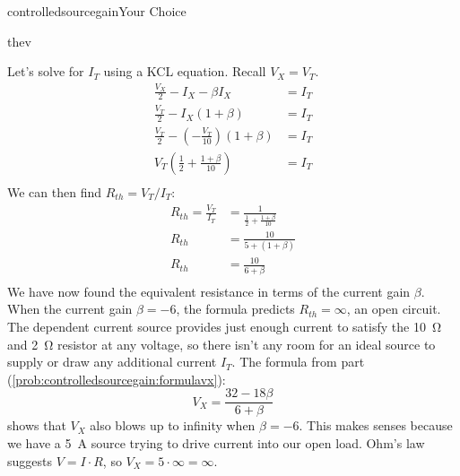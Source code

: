 \begin{mainquestion}{controlledsourcegain}{Your Choice}
\begin{partquestion}{thev}
\begin{answer}
Let's solve for $I_T$ using a KCL equation. Recall $V_X = V_T$.
\begin{align*}
    \frac{V_X}{2} - I_X - \beta I_X &= I_T \\
    \frac{V_T}{2} - I_X(1+\beta) &= I_T \\
    \frac{V_T}{2} - \left(-\frac{V_T}{10}\right)(1+\beta) &= I_T \\
    V_T\left(\frac{1}{2} + \frac{1+\beta}{10}\right) &= I_T \\
\end{align*}
We can then find $R_{th} = V_T/I_T$:
\begin{align*}
    R_{th} = \frac{V_T}{I_T} &= \frac{1}{\frac{1}{2} + \frac{1+\beta}{10}} \\
    R_{th} &= \frac{10}{5 + (1+\beta)} \\
    R_{th} &= \frac{10}{6+\beta} \\
\end{align*}
We have now found the equivalent resistance in terms of the current gain $\beta$. When the current gain $\beta = -6$, the formula predicts $R_{th} = \infty$, an open circuit. The dependent current source provides just enough current to satisfy the \qty{10}{\ohm} and \qty{2}{\ohm} resistor at any voltage, so there isn't any room for an ideal source to supply or draw any additional current $I_T$. The formula from part (\cref{prob:controlledsourcegain:formulavx}):
\[
V_X = \frac{32 - 18\beta}{6+\beta}
\]
shows that $V_X$ also blows up to infinity when $\beta = -6$. This makes senses because we have a \qty{5}{\ampere} source trying to drive current into our open load. Ohm's law suggests $V = I\cdot R$, so $V_X = 5 \cdot \infty = \infty$.
    
\end{answer}
\end{partquestion}

\end{mainquestion}
